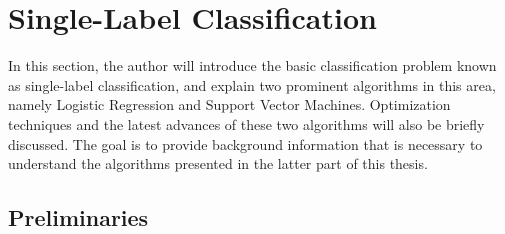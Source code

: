 %
\section{Single-Label Classification}\label{sc_slc}

In this section, the author will introduce the basic classification problem known as {single-label classification}, and explain two prominent algorithms in this area, namely Logistic Regression and Support Vector Machines.
Optimization techniques and the latest advances of these two algorithms will also be briefly discussed.
The goal is to provide background information that is necessary to understand the algorithms presented in the latter part of this thesis. 



%
%
\subsection{Preliminaries}\label{sc_slc_pn}

